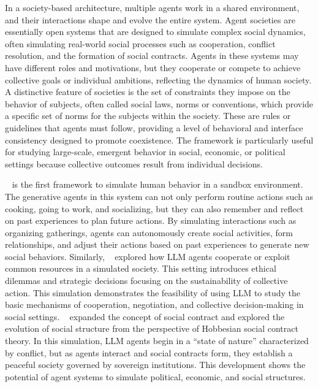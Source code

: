 In a society-based architecture, multiple agents work in a shared environment, and their interactions shape and evolve the entire system. Agent societies are essentially open systems that are designed to simulate complex social dynamics, often simulating real-world social processes such as cooperation, conflict resolution, and the formation of social contracts. Agents in these systems may have different roles and motivations, but they cooperate or compete to achieve collective goals or individual ambitions, reflecting the dynamics of human society. A distinctive feature of societies is the set of constraints they impose on the behavior of subjects, often called social laws, norms or conventions, which provide a specific set of norms for the subjects within the society. These are rules or guidelines that agents must follow, providing a level of behavioral and interface consistency designed to promote coexistence. The framework is particularly useful for studying large-scale, emergent behavior in social, economic, or political settings because collective outcomes result from individual decisions.

~\cite{stanf_villege} is the first framework to simulate human behavior in a sandbox environment. The generative agents in this system can not only perform routine actions such as cooking, going to work, and socializing, but they can also remember and reflect on past experiences to plan future actions. By simulating interactions such as organizing gatherings, agents can autonomously create social activities, form relationships, and adjust their actions based on past experiences to generate new social behaviors.
Similarly, ~\cite{govsim} explored how LLM agents cooperate or exploit common resources in a simulated society. This setting introduces ethical dilemmas and strategic decisions focusing on the sustainability of collective action. This simulation demonstrates the feasibility of using LLM to study the basic mechanisms of cooperation, negotiation, and collective decision-making in social settings.
~\cite{sct_society} expanded the concept of social contract and explored the evolution of social structure from the perspective of Hobbesian social contract theory. In this simulation, LLM agents begin in a “state of nature” characterized by conflict, but as agents interact and social contracts form, they establish a peaceful society governed by sovereign institutions. This development shows the potential of agent systems to simulate political, economic, and social structures.

